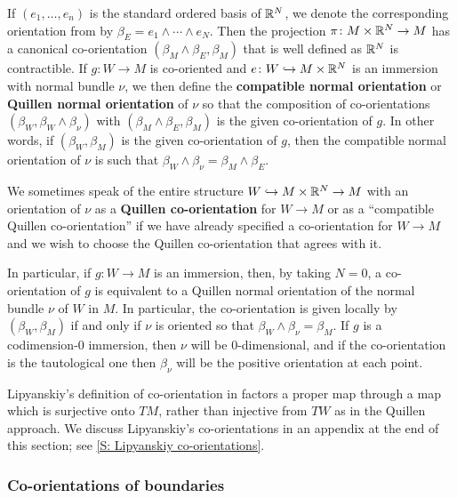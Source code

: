 \begin{definition}\label{D: Quillen normal or}
	If $(e_1, \ldots, e_n)$ is the standard ordered basis of $\mathbb{R}^N$, we denote the corresponding orientation from by $\beta_E = e_1 \wedge \cdots \wedge e_N$.
	Then the projection $\pi \colon M \times \mathbb{R}^N \to M$ has a canonical co-orientation $(\beta_M \wedge \beta_E, \beta_M)$ that is well defined as $\mathbb{R}^N$ is contractible.
	If $g \colon W \to M$ is co-oriented and $e \colon W \hookrightarrow M \times \mathbb{R}^N$ is an immersion with normal bundle $\nu$, we then define the \textbf{compatible normal orientation} or \textbf{Quillen normal orientation} of $\nu$ so that the composition of co-orientations $(\beta_W,\beta_W \wedge \beta_\nu)$ with $(\beta_M \wedge \beta_E,\beta_M)$ is the given co-orientation of $g$.
	In other words, if $(\beta_W,\beta_M)$ is the given co-orientation of $g$, then the compatible normal orientation of $\nu$ is such that $\beta_W \wedge \beta_\nu = \beta_M \wedge \beta_E$.

	We sometimes speak of the entire structure $W \hookrightarrow M \times \mathbb{R}^N \to M$ with an orientation of $\nu$ as a \textbf{Quillen co-orientation} for $W \to M$ or as a ``compatible Quillen co-orientation'' if we have already specified a co-orientation for $W \to M$ and we wish to choose the Quillen co-orientation that agrees with it.
\end{definition}

\begin{remark}\label{R: immersion}
	In particular, if $g \colon W \to M$ is an immersion, then, by taking $N = 0$, a co-orientation of $g$ is equivalent to a Quillen normal orientation of the normal bundle $\nu$ of $W$ in $M$.
	In particular, the co-orientation is given locally by $(\beta_W, \beta_M)$ if and only if $\nu$ is oriented so that $\beta_W \wedge \beta_\nu = \beta_M$.
	If $g$ is a codimension-$0$ immersion, then $\nu$ will be $0$-dimensional, and if the co-orientation is the tautological one then $\beta_\nu$ will be the positive orientation at each point.
\end{remark}

Lipyanskiy's definition of co-orientation in \cite{Lipy14} factors a proper map through a map which is surjective onto $TM$, rather than injective from $TW$ as in the Quillen approach.
We discuss Lipyanskiy's co-orientations in an appendix at the end of this section; see \cref{S: Lipyanskiy co-orientations}.

\subsubsection{Co-orientations of boundaries}

